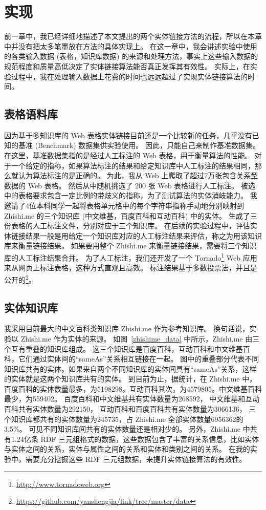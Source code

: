 \chapter{实现}
前一章中，我已经详细地描述了本文提出的两个实体链接方法的流程，所以在本章中并没有把太多笔墨放在方法的具体实现上。
在这一章中，我会讲述实验中使用的各类输入数据 (表格，知识库数据) 的来源和处理方法，事实上这些输入数据的规范程度和质量高低决定了实体链接算法能否真正发挥其有效性。
实际上，在实验过程中，我在处理输入数据上花费的时间也远远超过了实现实体链接算法的时间。


\section{表格语料库}
因为基于多知识库的 Web 表格实体链接目前还是一个比较新的任务，几乎没有已知的基准 (Benchmark) 数据集供实验使用。
因此，只能自己来制作基准数据集。
在这里，基准数据集指的是经过人工标注的 Web 表格，用于衡量算法的性能。
对于一个给定的指称，如果算法标注的结果和给定知识库中人工标注的结果相同，那么就认为算法标注的是正确的。
为此，我从 Web 上爬取了超过7万张包含关系型数据的 Web 表格。
然后从中随机挑选了 200 张 Web 表格进行人工标注。
被选中的表格要求包含一定比例的带歧义的指称，为了测试算法的实体消岐能力。
我邀请了4位本科同学一起将表格单元格中的每个字符串指称手动地分别映射到 Zhishi.me 的三个知识库 (中文维基，百度百科和互动百科) 中的实体。
生成了三份表格的人工标注文件，分别对应于三个知识库。
在后续的实验过程中，评估实体链接结果一般是用给定一个知识库对应的人工标注结果来评估，称之为用该知识库来衡量链接结果。
如果要用整个 Zhishi.me 来衡量链接结果，需要将三个知识库的人工标注结果合并。
为了人工标注，我们还开发了一个 Tornado\footnote{\url{http://www.tornadoweb.org}} Web 应用来从网页上标注表格，这种方式直观且高效。
标注结果基于多数投票法，并且是公开的\footnote{\url{https://github.com/yanshengjia/link/tree/master/data}}。


\section{实体知识库}
我采用目前最大的中文百科类知识库 Zhishi.me 作为参考知识库。
换句话说，实验以 Zhishi.me 作为实体的来源。
如图~\ref{zhishime_data} 中所示，Zhishi.me 由三个互有重叠的知识库组成。
这三个知识库是百度百科，互动百科和中文维基百科，它们通过实体间的``sameAs''关系相互链接在一起。
图中的重叠部分代表不同知识库共有的实体。如果来自两个不同知识库的实体间具有``sameAs''关系，这样的实体就是这两个知识库共有的实体。
到目前为止，据统计，在 Zhishi.me 中，百度百科的实体数量最多，为5198298。互动百科其次，为4579805。中文维基百科最少，为559402。
百度百科和中文维基共有实体数量为268592，
中文维基和互动百科共有实体数量为292150，
互动百科和百度百科共有实体数量为3066136，
三个知识库都共有的实体数量为245735，占 Zhishi.me 全部实体数量6956362的3.5\%。
可见不同知识库间共有的实体数量还是相对少的。
另外，Zhishi.me 中共有1.24亿条 RDF 三元组格式的数据，这些数据包含了丰富的关系信息，比如实体与实体之间的关系，实体与属性之间的关系和实体和类别之间的关系。
在我的实验中，需要充分挖掘这些 RDF 三元组数据，来提升实体链接算法的有效性。


